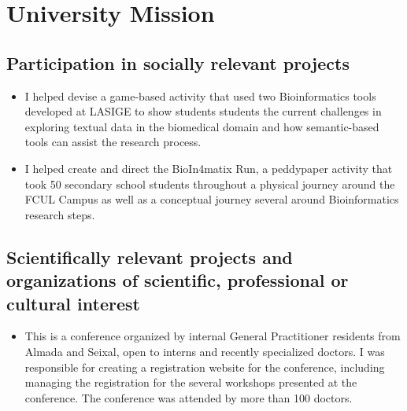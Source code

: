 \section{University Mission}

\subsection{Participation in socially relevant projects}

\begin{itemize}
    \item I helped devise a game-based activity that used two Bioinformatics tools developed at LASIGE to show students students the current challenges in exploring textual data in the biomedical domain and how semantic-based tools can assist the research process.
\end{itemize}

\begin{itemize}
    \item I helped create and direct the BioIn4matix Run, a peddypaper activity that took 50 secondary school students throughout a physical journey around the FCUL Campus as well as a conceptual journey several around Bioinformatics research steps.
\end{itemize}


\subsection{Scientifically relevant projects and organizations of scientific, professional or cultural interest}

\begin{itemize}
    \item This is a conference organized by internal General Practitioner residents from Almada and Seixal, open to interns and recently specialized doctors. I was responsible for creating a registration website for the conference, including managing the registration for the several workshops presented at the conference. The conference was attended by more than 100 doctors.
\end{itemize}